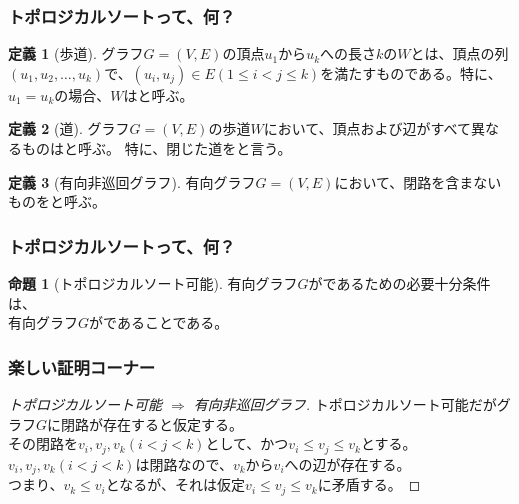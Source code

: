 \documentclass[aspectratio=169,dvipdfmx,12pt,notheorems]{beamer}
\theoremstyle{definition}
\newtheorem{definition}{定義}
\newtheorem{proposition}{命題}
\begin{document}
\begin{frame}\frametitle{トポロジカルソートって、何？}

\begin{definition}[歩道]
グラフ$G=(V, E)$の頂点$u_{1}$から$u_{k}$への長さ$k$の$W$とは、頂点の列$(u_{1}, u_{2}, \dots, u_{k})$で、$(u_{i}, u_{j}) \in E (1 \leq i < j \leq k)$を満たすものである。特に、$u_{1}=u_{k}$の場合、$W$はと呼ぶ。
\end{definition}

\begin{definition}[道]
グラフ$G=(V, E)$の歩道$W$において、頂点および辺がすべて異なるものはと呼ぶ。
特に、閉じた道をと言う。
\end{definition}

\begin{definition}[有向非巡回グラフ]
有向グラフ$G=(V, E)$において、閉路を含まないものをと呼ぶ。
\end{definition}

\end{frame}

\begin{frame}\frametitle{トポロジカルソートって、何？}

\begin{proposition}[トポロジカルソート可能]
有向グラフ$G$がであるための必要十分条件は、\\ 有向グラフ$G$がであることである。
\end{proposition}

\end{frame}

\begin{frame}\frametitle{楽しい証明コーナー}

\begin{proof}[トポロジカルソート可能 $\Rightarrow$ 有向非巡回グラフ]
トポロジカルソート可能だがグラフ$G$に閉路が存在すると仮定する。 \\
その閉路を$v_{i}, v_{j}, v_{k}(i < j < k)$として、かつ$ v_{i} \leq v_{j} \leq v_{k}$とする。
$v_{i}, v_{j}, v_{k}(i < j < k)$は閉路なので、$v_{k}$から$v_{i}$への辺が存在する。 \\
つまり、$v_{k} \leq v_{i}$となるが、それは仮定$ v_{i} \leq v_{j} \leq v_{k}$に矛盾する。
\end{proof}

\end{frame}
\end{document}
